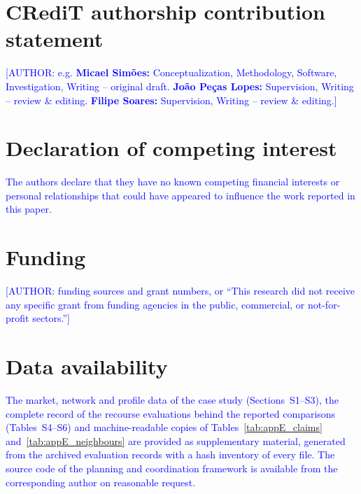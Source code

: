 
\section*{CRediT authorship contribution statement}
\textcolor{blue}{[AUTHOR: e.g. \textbf{Micael Simões:} Conceptualization, Methodology, Software, Investigation, Writing -- original draft. \textbf{João Peças Lopes:} Supervision, Writing -- review \& editing. \textbf{Filipe Soares:} Supervision, Writing -- review \& editing.]}

\section*{Declaration of competing interest}
\textcolor{blue}{The authors declare that they have no known competing financial interests or personal relationships that could have appeared to influence the work reported in this paper.}

\section*{Funding}
\textcolor{blue}{[AUTHOR: funding sources and grant numbers, or ``This research did not receive any specific grant from funding agencies in the public, commercial, or not-for-profit sectors.'']}

\section*{Data availability}
\textcolor{blue}{The market, network and profile data of the case study (Sections~S1--S3), the complete record of the recourse evaluations behind the reported comparisons (Tables~S4--S6) and machine-readable copies of Tables~\ref{tab:appE_claims} and~\ref{tab:appE_neighbours} are provided as supplementary material, generated from the archived evaluation records with a hash inventory of every file. The source code of the planning and coordination framework is available from the corresponding author on reasonable request.}
